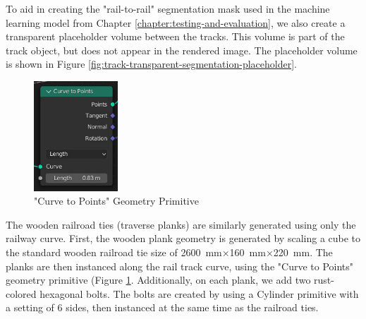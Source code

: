 To aid in creating the "rail-to-rail" segmentation mask used in the machine learning model from Chapter \ref{chapter:testing-and-evaluation}, we also create a transparent placeholder volume between the tracks. This volume is part of the track object, but does not appear in the rendered image. The placeholder volume is shown in Figure \ref{fig:track-transparent-segmentation-placeholder}.


\begin{figure}
    \centering
    \includegraphics[width=0.28\textwidth]{src/img/procedural-tracks/2c-planks-curve-to-points.jpg}
     \caption{"Curve to Points" Geometry Primitive}
     \label{fig:curve-to-points}
\end{figure}

The wooden railroad ties (traverse planks) are similarly generated using only the railway curve. First, the wooden plank geometry is generated by scaling a cube to the standard wooden railroad tie size of 2600 mm×160 mm×220 mm. The planks are then instanced along the rail track curve, using the "Curve to Points" geometry primitive (Figure \ref{fig:curve-to-points}. Additionally, on each plank, we add two rust-colored hexagonal bolts. The bolts are created by using a Cylinder primitive with a setting of 6 sides, then instanced at the same time as the railroad ties.

